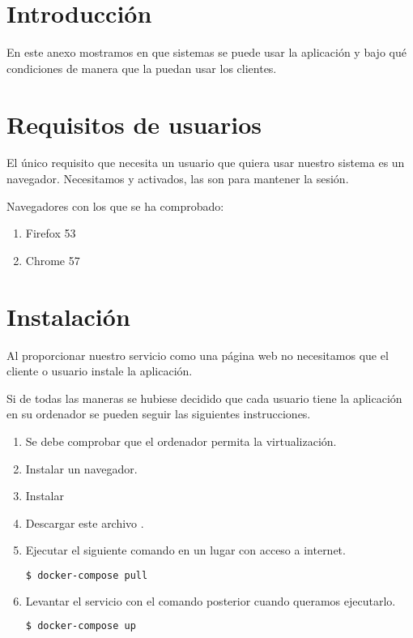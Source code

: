 
\section{Introducción}
En este anexo mostramos en que sistemas se puede usar la aplicación y bajo qué condiciones de manera que la puedan usar los clientes.

\section{Requisitos de usuarios}
El único requisito que necesita un usuario que quiera usar nuestro sistema es un navegador. Necesitamos  y  activados, las  son para mantener la sesión.

Navegadores con los que se ha comprobado:
\begin{enumerate}
\item Firefox 53 
\item Chrome 57
\end{enumerate}


\section{Instalación}
Al proporcionar nuestro servicio como una página web no necesitamos que el cliente o usuario instale la aplicación. 

Si de todas las maneras se hubiese decidido que cada usuario tiene la aplicación en su ordenador se pueden seguir las siguientes instrucciones.


\begin{enumerate}
\setlength{\itemsep}{1pt}
\setlength{\parskip}{0pt}
\setlength{\parsep}{0pt}
\item Se debe comprobar que el ordenador permita la virtualización.
\item Instalar un navegador.
\item Instalar 
\item Descargar este archivo .
\item Ejecutar el siguiente comando en un lugar con acceso a internet.

\lstset{style=linestyle}
\begin{lstlisting}[language=bash]
    $ docker-compose pull 
\end{lstlisting}

\item Levantar el servicio con el comando posterior cuando queramos ejecutarlo.

\lstset{style=linestyle}
\begin{lstlisting}[language=bash]
    $ docker-compose up
\end{lstlisting}

\end{enumerate}

